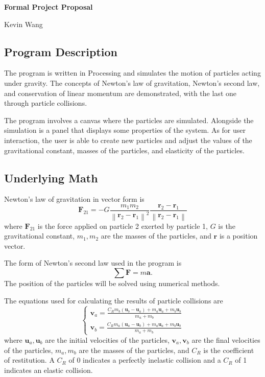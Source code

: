 \documentclass{article}
\newcommand{\norm}[1]{\ensuremath{\left\|#1\right\|}}
\renewcommand{\vec}{\mathbf}
\begin{document}
\begin{center}
	{\LARGE \textbf{Formal Project Proposal}}

	\vspace{5mm}
	{\Large Kevin Wang}
\end{center}

\subsection*{Program Description}

The program is written in Processing and simulates the motion of particles acting under gravity. The concepts of Newton's law of gravitation, Newton's second law, and conservation of linear momentum are demonstrated, with the last one through particle collisions.

The program involves a canvas where the particles are simulated. Alongside the simulation is a panel that displays some properties of the system. As for user interaction, the user is able to create new particles and adjust the values of the gravitational constant, masses of the particles, and elasticity of the particles.

\subsection*{Underlying Math}

Newton's law of gravitation in vector form is
\[\vec{F}_{21}=-G\frac{m_1m_2}{\norm{\vec{r}_2-\vec{r}_1}^2}\frac{\vec{r}_2-\vec{r}_1}{\norm{\vec{r}_2-\vec{r}_1}}\]
where $\vec{F}_{21}$ is the force applied on particle 2 exerted by particle 1, $G$ is the gravitational constant, $m_1,m_2$ are the masses of the particles, and $\vec{r}$ is a position vector.

The form of Newton's second law used in the program is
\[\sum\vec{F}=m\vec{a}.\]
The position of the particles will be solved using numerical methods.

The equations used for calculating the results of particle collisions are
\[
\begin{cases}
	\vec{v}_a=\frac{C_Rm_b(\vec{u}_b-\vec{u}_a)+m_a\vec{u}_a+m_b\vec{u}_b}{m_a+m_b}\\
	\vec{v}_b=\frac{C_Rm_a(\vec{u}_a-\vec{u}_b)+m_a\vec{u}_a+m_b\vec{u}_b}{m_a+m_b}
\end{cases}
\]
where $\vec{u}_a,\vec{u}_b$ are the initial velocities of the particles, $\vec{v}_a,\vec{v}_b$ are the final velocities of the particles, $m_a,m_b$ are the masses of the particles, and $C_R$ is the coefficient of restitution. A $C_R$ of 0 indicates a perfectly inelastic collision and a $C_R$ of 1 indicates an elastic collision.
\end{document}
